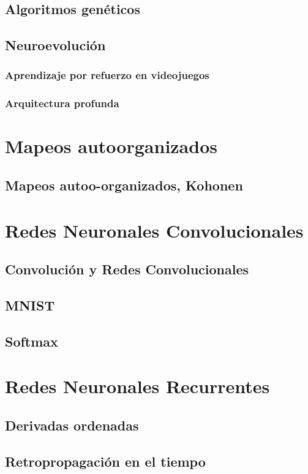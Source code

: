 \documentclass[12pt,openany]{book}
\begin{document}
\section{Algoritmos genéticos}
\section{Neuroevolución}
\subsection{Aprendizaje por refuerzo en videojuegos}
\subsection{Arquitectura profunda}

\chapter{Mapeos autoorganizados}
\section{Mapeos autoo-organizados, Kohonen}

\chapter{Redes Neuronales Convolucionales}
\section{Convolución y Redes Convolucionales}
\section{MNIST}
\section{Softmax}

\chapter{Redes Neuronales Recurrentes}
\section{Derivadas ordenadas}
\section{Retropropagación en el tiempo}
\end{document}
